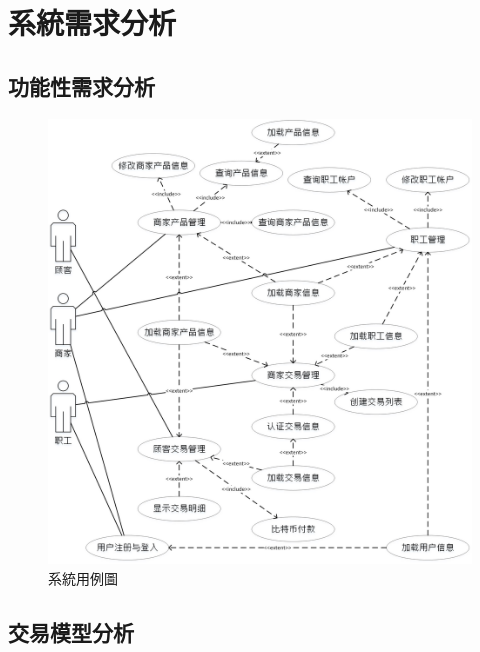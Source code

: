 \chapter{系統需求分析}


\section{功能性需求分析}


\begin{figure}[!htbp]
	\centering
	\includegraphics[width = 1\textwidth]{UC.jpg}
	\caption{系統用例圖}\label{UC}
\end{figure}



\section{交易模型分析}

